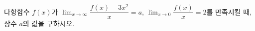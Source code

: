 다항함수 $f(x)$가 $\displaystyle\lim_{x\to\infty}\dfrac{f(x)-3x^2}{x}=a$, $\displaystyle\lim_{x\to 0}\dfrac{f(x)}{x}=2$를 만족시킬 때, 상수 $a$의 값을 구하시오. 
